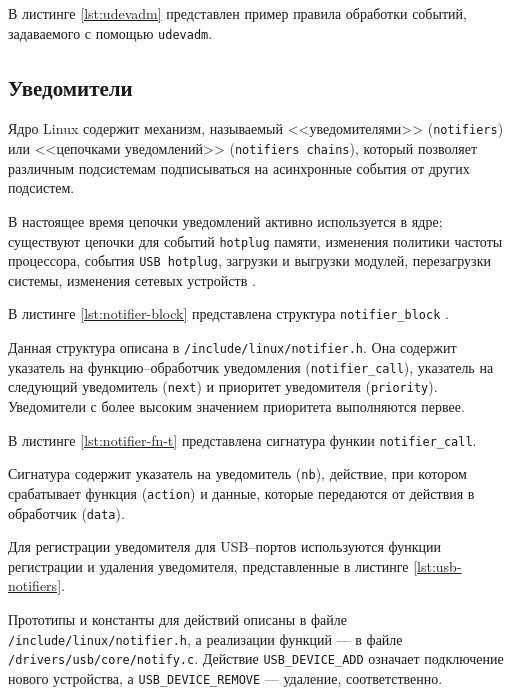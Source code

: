 В листинге \ref{lst:udevadm} представлен пример правила обработки событий, задаваемого с помощью \texttt{udevadm}.


\subsection{Уведомители}

Ядро Linux содержит механизм, называемый <<уведомителями>> (\texttt{notifiers}) или <<цепочками уведомлений>> (\texttt{notifiers chains}), который позволяет различным подсистемам подписываться на асинхронные события от других подсистем. 

В настоящее время цепочки уведомлений активно используется в ядре; существуют цепочки для событий \texttt{hotplug} памяти, изменения политики частоты процессора, события \texttt{USB hotplug}, загрузки и выгрузки модулей, перезагрузки системы, изменения сетевых устройств \cite{notifications}.

В листинге \ref{lst:notifier-block} представлена структура \texttt{notifier\_block} \cite{notifierblock}.


Данная структура описана в \texttt{/include/linux/notifier.h}. Она содержит указатель на функцию--обработчик уведомления (\texttt{notifier\_call}), указатель на следующий уведомитель (\texttt{next}) и приоритет уведомителя (\texttt{priority}). Уведомители с более высоким значением приоритета выполняются первее.

В листинге \ref{lst:notifier-fn-t} представлена сигнатура функии \texttt{notifier\_call}.


Сигнатура содержит указатель на уведомитель (\texttt{nb}), действие, при котором срабатывает функция (\texttt{action}) и данные, которые передаются от действия в обработчик (\texttt{data}).

Для регистрации уведомителя для USB--портов используются функции регистрации и удаления уведомителя, представленные в листинге \ref{lst:usb-notifiers}.


Прототипы и константы для действий описаны в файле \texttt{/include/linux/notifier.h}, а реализации функций --- в файле\\ \texttt{/drivers/usb/core/notify.c}. Действие \texttt{USB\_DEVICE\_ADD} означает подключение нового устройства, а \texttt{USB\_DEVICE\_REMOVE} --- удаление, соответственно.

